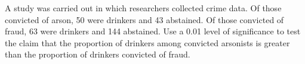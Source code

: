 
 
 \item A study was carried out in which researchers collected crime data. Of those convicted of
 arson, 50 were drinkers and 43 abstained. Of those convicted of fraud, 63 were drinkers and 144
 abstained. Use a 0.01 level of significance to test the claim that the proportion of drinkers among
 convicted arsonists is greater than the proportion of drinkers convicted of fraud.
 